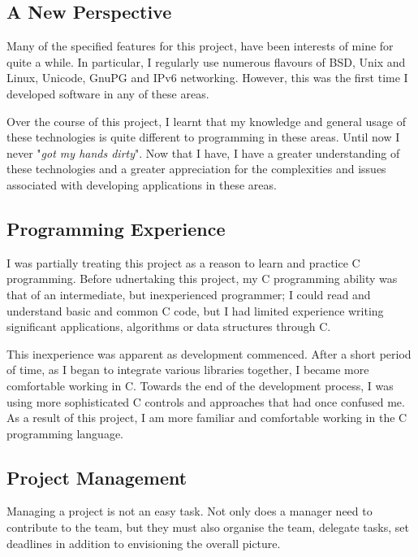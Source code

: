 
\subsection{A New Perspective}

Many of the specified features for this project, have been interests of
mine for quite a while. In particular, I regularly use numerous flavours
of BSD, Unix and Linux, Unicode, GnuPG and IPv6 networking. However, this 
was the first time I developed software in any of these areas.


Over the course of this project, I learnt that my knowledge and general
usage of these technologies is quite different to programming in these
areas. Until now I never "\emph{got my hands dirty}". Now that I have, I
have a greater understanding of these technologies and a greater
appreciation for the complexities and issues associated with developing
applications in these areas.

\subsection{Programming Experience}

I was partially treating this project as a reason to learn and practice
C programming. Before udnertaking this project, my C programming ability
was that of an intermediate, but inexperienced programmer; I could read 
and understand basic and common C code, but I had limited experience
writing significant applications, algorithms or data structures through
C.


This inexperience was apparent as development commenced. After a short
period of time, as I began to integrate various libraries together, I
became more comfortable working in C. Towards the end of the
development process, I was using more sophisticated C controls and
approaches that had once confused me. As a result of this project, I am
more familiar and comfortable working in the C programming language.


\subsection{Project Management}


Managing a project is not an easy task. Not only does a manager need to
contribute to the team, but they must also organise the team, delegate
tasks, set deadlines in addition to envisioning the overall picture.


